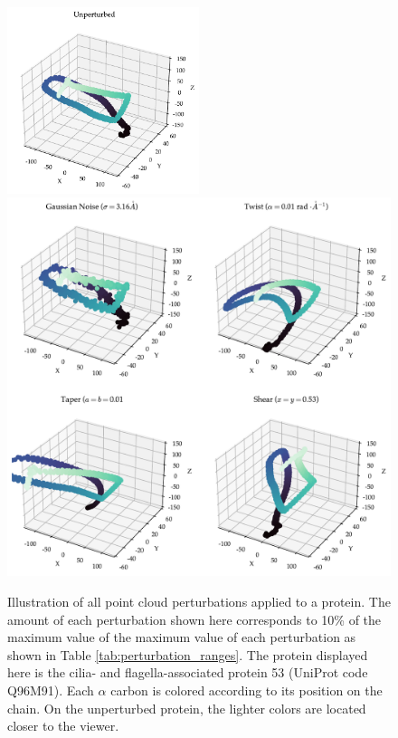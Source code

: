 \begin{figure}
  \centering
  \includegraphics[width=0.5\textwidth]{./figures/protein_unperturbed.pdf}
  \includegraphics[width=\textwidth]{./figures/protein_perturbed.pdf}
  \caption[Illustration of all point cloud perturbations applied to a
protein.]{Illustration of all point cloud perturbations applied to a protein.
The amount of each perturbation shown here corresponds to 10\% of the maximum
value of the maximum value of each perturbation as shown in Table
\ref{tab:perturbation_ranges}. The protein displayed here is the cilia- and
flagella-associated protein 53 (UniProt code Q96M91). Each $\alpha$ carbon is
colored according to its position on the chain. On the unperturbed protein, the
lighter colors are located closer to the viewer.}
  \label{fig:perturbation_illustration}
\end{figure}

